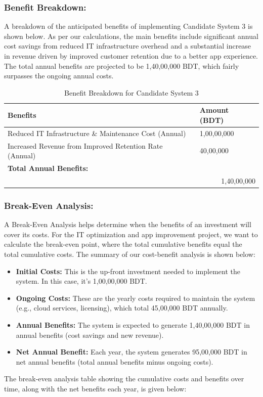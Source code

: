 \documentclass[12pt,a4paper]{article}
\begin{document}
\subsubsection{Benefit Breakdown:}
A breakdown of the anticipated benefits of implementing Candidate System 3 is shown below. As per our calculations, the main benefits include significant annual cost savings from reduced IT infrastructure overhead and a substantial increase in revenue driven by improved customer retention due to a better app experience. The total annual benefits are projected to be 1,40,00,000 BDT, which fairly surpasses the ongoing annual costs.

\begin{table}[h]
    \centering
    \caption{Benefit Breakdown for Candidate System 3}
    \begin{tabular}{|p{10cm}|p{3cm}|}
        \hline
        \textbf{Benefits} & \textbf{Amount (BDT)} \\ \hline
        Reduced IT Infrastructure \& Maintenance Cost (Annual) & 1,00,00,000 \\ \hline
        Increased Revenue from Improved Retention Rate (Annual) & 40,00,000 \\ \hline
        \multicolumn{2}{|l|}{\textbf{Total Annual Benefits:}} \\ \hline
        \multicolumn{2}{|r|}{1,40,00,000} \\ \hline
    \end{tabular}
\end{table}

\subsubsection{Break-Even Analysis:}
A Break-Even Analysis helps determine when the benefits of an investment will cover its costs. For the IT optimization and app improvement project, we want to calculate the break-even point, where the total cumulative benefits equal the total cumulative costs. The summary of our cost-benefit analysis is shown below:
\begin{itemize}
    \item \textbf{Initial Costs:} This is the up-front investment needed to implement the system. In this case, it's 1,00,00,000 BDT.
    
    \item \textbf{Ongoing Costs:} These are the yearly costs required to maintain the system (e.g., cloud services, licensing), which total 45,00,000 BDT annually.
    
    \item \textbf{Annual Benefits:} The system is expected to generate 1,40,00,000 BDT in annual benefits (cost savings and new revenue).
    
    \item \textbf{Net Annual Benefit:} Each year, the system generates 95,00,000 BDT in net annual benefits (total annual benefits minus ongoing costs).
\end{itemize}
The break-even analysis table showing the cumulative costs and benefits over time, along with the net benefits each year, is given below:
\end{document}
